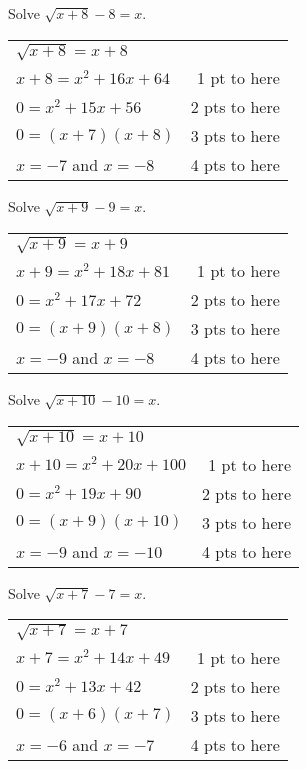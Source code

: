 {
	Solve $\displaystyle \sqrt{x+8}-8=x$.
}
{
	\begin{tabular}{l r}
	$\sqrt{x+8}=x+8$ & \\
	$x+8=x^2+16x+64$ & 1  pt to here\\
	$0=x^2+15x+56$ & 2 pts to here\\
	$0=(x+7)(x+8)$ & 3 pts to here \\
	$x=-7$ and $x=-8$ & 4 pts to here
	\end{tabular}
}

{
	Solve $\displaystyle \sqrt{x+9}-9=x$.
}
{
	\begin{tabular}{l r}
	$\sqrt{x+9}=x+9$ & \\
	$x+9=x^2+18x+81$ & 1  pt to here\\
	$0=x^2+17x+72$ & 2 pts to here\\
	$0=(x+9)(x+8)$ & 3 pts to here \\
	$x=-9$ and $x=-8$ & 4 pts to here
	\end{tabular}
}

{
	Solve $\displaystyle \sqrt{x+10}-10=x$.
}
{
	\begin{tabular}{l r}
	$\sqrt{x+10}=x+10$ & \\
	$x+10=x^2+20x+100$ & 1  pt to here\\
	$0=x^2+19x+90$ & 2 pts to here\\
	$0=(x+9)(x+10)$ & 3 pts to here \\
	$x=-9$ and $x=-10$ & 4 pts to here
	\end{tabular}
}

{
	Solve $\displaystyle \sqrt{x+7}-7=x$.
}
{
	\begin{tabular}{l r}
	$\sqrt{x+7}=x+7$ & \\
	$x+7=x^2+14x+49$ & 1  pt to here\\
	$0=x^2+13x+42$ & 2 pts to here\\
	$0=(x+6)(x+7)$ & 3 pts to here \\
	$x=-6$ and $x=-7$ & 4 pts to here
	\end{tabular}
}
